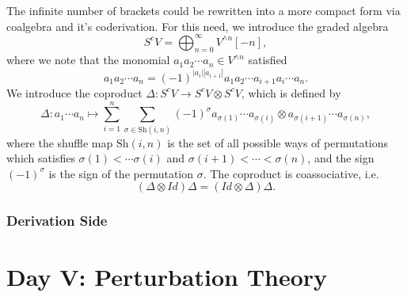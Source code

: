 \documentclass[10pt]{article}
\begin{document}
The infinite number of brackets could be rewritten into a more compact form via coalgebra and it's coderivation. For this need, we introduce the graded algebra
\begin{equation*}
  S^{c} V = \bigoplus_{n=0}^{\infty} V^{\wedge n}[-n],
\end{equation*}
where we note that the monomial $ a_1 a_2\cdots a_n \in V^{\wedge n}$ satisfied
\begin{equation*}
  a_1 a_2 \cdots a_n = (-1)^{\left| a_i \right| \left| a_{i+1} \right|} a_1 a_2 \cdots a_{i+1} a_i \cdots a_n.
\end{equation*}
We introduce the coproduct $ \Delta : S^{c} V \rightarrow S^{c} V \otimes S^{c} V$, which is defined by
\begin{equation*}
  \Delta : a_1 \cdots a_n \mapsto \sum_{i=1}^{n} \sum_{\sigma \in \mathrm{Sh}(i,n)} (-1)^{\sigma} a_{\sigma(1)} \cdots a_{\sigma(i)} \otimes a_{\sigma(i+1)} \cdots a_{\sigma(n)},
\end{equation*}
where the shuffle map $ \mathrm{Sh}(i,n)$ is the set of all possible ways of permutations which satisfies $ \sigma(1) < \cdots \sigma(i)$ and $ \sigma(i+1) < \cdots < \sigma(n)$,
and the sign $ (-1)^{\sigma}$ is the sign of the permutation $\sigma$.
The coproduct is coassociative, i.e.
\begin{equation*}
  (\Delta \otimes Id) \Delta = (Id \otimes \Delta) \Delta.
\end{equation*}

\subsubsection{Derivation Side}

\section{Day V: Perturbation Theory}

\label{LastPage}
\end{document}
